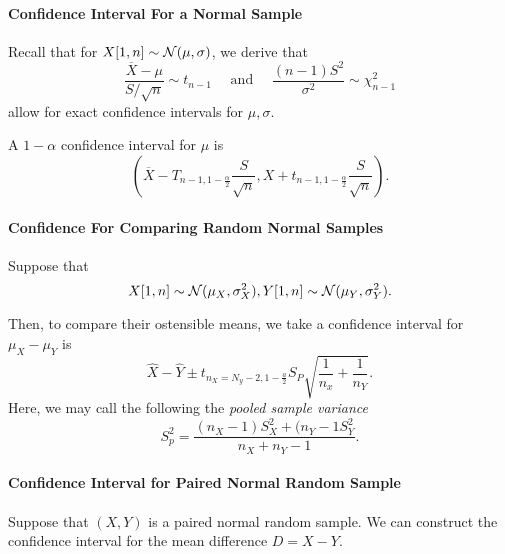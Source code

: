 \paragraph{Confidence Interval For a Normal Sample}
Recall that for \(X[1, n] \sim \mathcal{N}(\mu, \sigma)\), we derive that \[
  \frac{\overline{X} - \mu}{S/\sqrt{n}} \sim t_{n - 1}
  \quad \text{ and } \quad
  \frac{(n - 1)S^2}{\sigma^2} \sim \chi^2_{n - 1}
\]  allow for exact confidence intervals for \(\mu, \sigma\).

A \(1 - \alpha\) confidence interval for  \(\mu\) is  \[
  \left(
    \overline{X} - T_{n - 1, 1 - \frac{\alpha}{2}} \frac{S}{\sqrt{n} },
    X + t_{n - 1, 1 - \frac{\alpha}{2}} \frac{S}{\sqrt{n}}
  \right)
.\]

\paragraph{Confidence For Comparing Random Normal Samples}
Suppose that \[
  X[1, n] \sim \mathcal{N}(\mu_X, \sigma_X^2), 
  Y[1, n] \sim \mathcal{N}(\mu_Y, \sigma_Y^2)
.\] 

Then, to compare their ostensible means, we take a confidence interval for
\(\mu_X - \mu_Y\) is \[
  \hat{X} - \hat{Y} \pm t_{n_X = N_y - 2, 1 - \frac{a}{2}} S_P \sqrt{\frac{1}{n_x} + \frac{1}{n_Y}} 
.\] 
Here, we may call the following the \textit{pooled sample variance} \[
  S_p^2 = \frac{(n_X - 1)S^2_X + (n_Y - 1S^2_Y}{n_X + n_Y - 1}
.\] 

\paragraph{Confidence Interval for Paired Normal Random Sample}
Suppose that \((X, Y)\) is a paired normal random sample. We can construct the confidence interval
for the mean difference  \(D = X - Y\).

